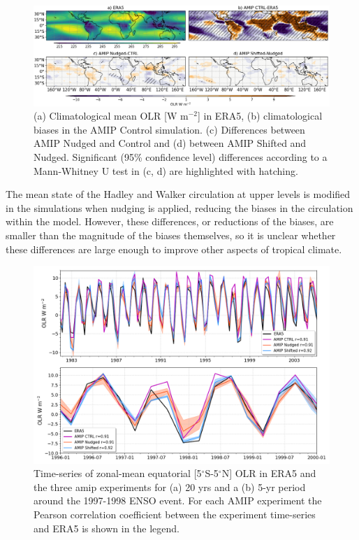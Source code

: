 \begin{figure}[t!]
\centering
 \includegraphics[width=\linewidth]{figures/olr_check.png}
\caption[Annual mean OLR  in atmosphere-only experiments]{(a) Climatological mean OLR [W m$^{-2}$] in ERA5, (b) climatological biases in the AMIP Control simulation. (c) Differences between AMIP Nudged and Control and (d) between AMIP Shifted and Nudged. Significant (95\% confidence level) differences according to a Mann-Whitney U test in (c, d) are highlighted with hatching. }
\label{fig:olr-mean}
\end{figure}

The mean state of the Hadley and Walker circulation at upper levels is modified in the simulations when nudging is applied, reducing the biases in the circulation within the model. However, these differences, or reductions of the biases, are smaller than the magnitude of the biases themselves, so it is unclear whether these differences are  large enough to improve other aspects of tropical climate. 

\begin{figure}[t!]
\centering
 \includegraphics[width=\linewidth]{figures/olr_tseries.png}
\caption[Tropical mean OLR time series.]{Time-series of zonal-mean equatorial [5$^\circ$S-5$^\circ$N]  OLR in ERA5 and the three amip experiments for (a) 20 yrs and a (b) 5-yr period around the 1997-1998 ENSO event. For each AMIP experiment the Pearson correlation coefficient between the experiment time-series and ERA5 is shown in the legend. }
\label{fig:olramip_tseries}
\end{figure}

